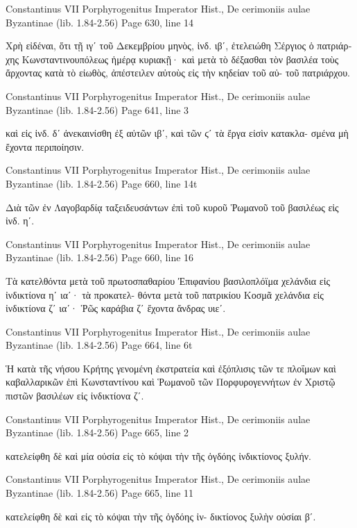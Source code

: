 \documentclass[12pt,letterpaper,twoside,final]{memoir}
\begin{document}
\begin{greek}
Constantinus VII Porphyrogenitus Imperator Hist., De cerimoniis aulae Byzantinae (lib. 1.84-2.56) 
Page 630, line 14

Χρὴ εἰδέναι, ὅτι τῇ ιγʹ τοῦ Δεκεμβρίου μηνὸς, ἰνδ. ιβʹ, 
ἐτελειώθη Σέργιος ὁ πατριάρχης Κωνσταντινουπόλεως ἡμέρᾳ 
κυριακῇ· καὶ μετὰ τὸ δέξασθαι τὸν βασιλέα τοὺς ἄρχοντας 
κατὰ τὸ εἰωθὸς, ἀπέστειλεν αὐτοὺς εἰς τὴν κηδείαν τοῦ αὐ-
τοῦ πατριάρχου. 



Constantinus VII Porphyrogenitus Imperator Hist., De cerimoniis aulae Byzantinae (lib. 1.84-2.56) 
Page 641, line 3

                                             καὶ εἰς ἰνδ. δʹ 
ἀνεκαινίσθη ἐξ αὐτῶν ιβʹ, καὶ τῶν ϛʹ τὰ ἔργα εἰσὶν κατακλα-
σμένα μὴ ἔχοντα περιποίησιν. 



Constantinus VII Porphyrogenitus Imperator Hist., De cerimoniis aulae Byzantinae (lib. 1.84-2.56) 
Page 660, line 14t

Διὰ τῶν ἐν Λαγοβαρδίᾳ ταξειδευσάντων ἐπὶ τοῦ κυροῦ Ῥωμανοῦ 
τοῦ βασιλέως εἰς ἰνδ. ηʹ. 




Constantinus VII Porphyrogenitus Imperator Hist., De cerimoniis aulae Byzantinae (lib. 1.84-2.56) 
Page 660, line 16

Τὰ κατελθόντα μετὰ τοῦ πρωτοσπαθαρίου Ἐπιφανίου 
βασιλοπλόϊμα χελάνδια εἰς ἰνδικτίονα ηʹ ιαʹ· τὰ προκατελ-
θόντα μετὰ τοῦ πατρικίου Κοσμᾶ χελάνδια εἰς ἰνδικτίονα 
ζʹ ιαʹ· Ῥῶς καράβια ζʹ ἔχοντα ἄνδρας υιεʹ. 



Constantinus VII Porphyrogenitus Imperator Hist., De cerimoniis aulae Byzantinae (lib. 1.84-2.56) 
Page 664, line 6t

Ἡ κατὰ τῆς νήσου Κρήτης γενομένη ἐκστρατεία καὶ ἐξόπλισις τῶν 
τε πλοΐμων καὶ καβαλλαρικῶν ἐπὶ Κωνσταντίνου καὶ Ῥωμανοῦ τῶν 
Πορφυρογεννήτων ἐν Χριστῷ πιστῶν βασιλέων εἰς ἰνδικτίονα ζʹ. 



Constantinus VII Porphyrogenitus Imperator Hist., De cerimoniis aulae Byzantinae (lib. 1.84-2.56) 
Page 665, line 2

                                  κατελείφθη δὲ καὶ μία οὐσία 
εἰς τὸ κόψαι τὴν τῆς ὀγδόης ἰνδικτίονος ξυλήν. 



Constantinus VII Porphyrogenitus Imperator Hist., De cerimoniis aulae Byzantinae (lib. 1.84-2.56) 
Page 665, line 11

        κατελείφθη δὲ καὶ εἰς τὸ κόψαι τὴν τῆς ὀγδόης ἰν-
δικτίονος ξυλὴν οὐσίαι βʹ. 




\end{greek}
\end{document}
